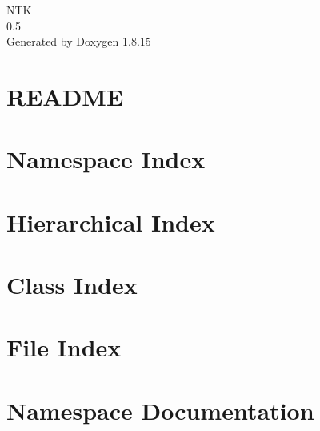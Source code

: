 \let\mypdfximage\pdfximage\def\pdfximage{\immediate\mypdfximage}\documentclass[twoside]{book}
\newcommand{\+}{\discretionary{\mbox{\scriptsize$\hookleftarrow$}}{}{}}
\newcommand{\clearemptydoublepage}{%
  \newpage{\pagestyle{empty}\cleardoublepage}%
}
\begin{document}
\hypersetup{pageanchor=false,
             bookmarksnumbered=true,
             pdfencoding=unicode
            }
\begin{titlepage}
\vspace*{7cm}
\begin{center}%
{\Large N\+TK \\[1ex]\large 0.\+5 }\\
\vspace*{1cm}
{\large Generated by Doxygen 1.8.15}\\
\end{center}
\end{titlepage}
\clearemptydoublepage
{}
\tableofcontents
\clearemptydoublepage
{}
\hypersetup{pageanchor=true}

\chapter{R\+E\+A\+D\+ME}
\label{md__n_t_k__r_e_a_d_m_e}

\chapter{Namespace Index}

\chapter{Hierarchical Index}

\chapter{Class Index}

\chapter{File Index}

\chapter{Namespace Documentation}















\end{document}
